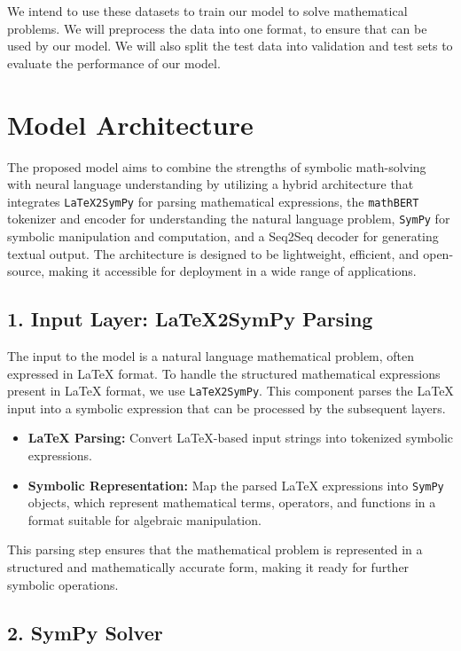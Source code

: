 \documentclass{article}
\begin{document}
We intend to use these datasets to train our model to solve mathematical problems. We will preprocess the data into one format, to ensure that can be used by our model. We will also split the test data into validation and test sets to evaluate the performance of our model.

\section{Model Architecture}

The proposed model aims to combine the strengths of symbolic math-solving with neural language understanding by utilizing a hybrid architecture that integrates \texttt{LaTeX2SymPy} for parsing mathematical expressions, the \texttt{mathBERT} tokenizer and encoder for understanding the natural language problem, \texttt{SymPy} for symbolic manipulation and computation, and a Seq2Seq decoder for generating textual output. The architecture is designed to be lightweight, efficient, and open-source, making it accessible for deployment in a wide range of applications.

\subsection{1. Input Layer: LaTeX2SymPy Parsing}

The input to the model is a natural language mathematical problem, often expressed in LaTeX format. To handle the structured mathematical expressions present in LaTeX format, we use \texttt{LaTeX2SymPy}. This component parses the LaTeX input into a symbolic expression that can be processed by the subsequent layers.

\begin{itemize}
    \item \textbf{LaTeX Parsing:} Convert LaTeX-based input strings into tokenized symbolic expressions.
    \item \textbf{Symbolic Representation:} Map the parsed LaTeX expressions into \texttt{SymPy} objects, which represent mathematical terms, operators, and functions in a format suitable for algebraic manipulation.
\end{itemize}

This parsing step ensures that the mathematical problem is represented in a structured and mathematically accurate form, making it ready for further symbolic operations.

\subsection{2. SymPy Solver}
\end{document}
